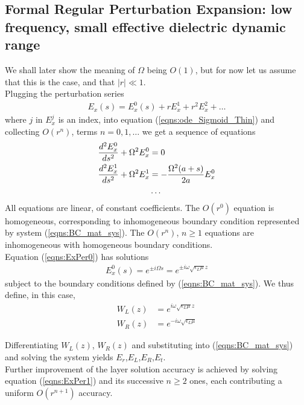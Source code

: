 \documentclass[twocolumn,secnumarabic,amssymb, nobibnotes, aps, prd]{revtex4-1}
\begin{document}
\subsection{Formal Regular Perturbation Expansion: low frequency, small effective dielectric dynamic range}
We shall later show the meaning of $\Omega$ being $O(1)$, but for now let us assume that this is the case, and that $|r| \ll 1$. \\
Plugging the perturbation series 
\begin{align}
E_x(s)=E_x^0(s)+r E_x^1 + r^2 E_x^2+ \ldots
\end{align}
where $j$ in $E_x^j$ is an index, into equation (\ref{eqns:ode_Sigmoid_Thin}) and collecting $O(r^n)$, terms $n=0,1, \ldots$ we get a sequence of equations
\begin{subequations}
\begin{align}
\label{eqns:ExPer0}
\dfrac{d^2 E_x^0}{ds^2} + \Omega^2 E_x^0&=0 \\
\label{eqns:ExPer1}
\dfrac{d^2 E_x^1}{ds^2} + \Omega^2 E_x^1&=-\dfrac{\Omega ^2 (a+s)}{2 a} E_x^0 \\
& \ldots \notag
\end{align}
\end{subequations}
All equations are linear, of constant coefficients. The $O(r^0)$ equation is homogeneous, corresponding to inhomogeneous boundary condition  represented by  system (\ref{eqns:BC_mat_sys}). The $O(r^n)$, $n \geq  1$ equations are inhomogeneous with homogeneous boundary conditions. \\
Equation (\ref{eqns:ExPer0}) has solutions
\begin{align}
E_x^0(s) = e^{\pm i \Omega s}=e^{\pm i \omega \sqrt{\epsilon_L \mu} z}
\end{align}  
subject to the boundary conditions defined by (\ref{eqns:BC_mat_sys}). We thus define, in this case,
\begin{subequations}
\begin{align}
W_L(z) &= e^{i \omega \sqrt{\epsilon_L \mu} z}\\
W_R(z) &= e^{-i \omega  \sqrt{\epsilon_L \mu}}
\end{align}
\end{subequations}

Differentiating $W_L(z)$, $W_R(z)$ and substituting into (\ref{eqns:BC_mat_sys}) and solving the system yields $E_r$,$E_L$,$E_R$,$E_t$.\\
Further improvement of the layer solution accuracy is achieved by solving equation (\ref{eqns:ExPer1}) and its successive $n \geq 2$ ones, each contributing a uniform $O(r^{n+1})$ accuracy.
\end{document}
